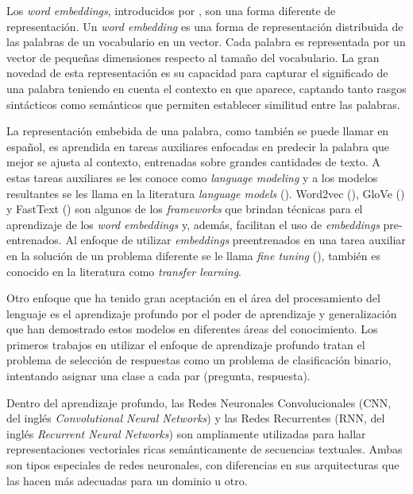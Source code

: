 Los \textit{word embeddings}, introducidos por \cite{mikolov-2013-word2vec}, son una forma diferente de representación. Un \textit{word embedding} es una forma de representación distribuida de las palabras de un vocabulario en un vector. Cada palabra es representada por un vector de pequeñas dimensiones respecto al tamaño del vocabulario. La gran novedad de esta representación es su capacidad para capturar el significado de una palabra teniendo en cuenta el contexto en que aparece, captando tanto rasgos sintácticos como semánticos que permiten establecer similitud entre las palabras.

La representación embebida de una palabra, como también se puede llamar en español, es aprendida en tareas auxiliares enfocadas en predecir la palabra que mejor se ajusta al contexto, entrenadas sobre grandes cantidades de texto. A estas tareas auxiliares se les conoce como \textit{language modeling} y a los modelos resultantes se les llama en la literatura \textit{language models} (\cite{rao-2019-nlpPython}). Word2vec (\cite{mikolov-2013-word2vec}), GloVe (\cite{pennington-2014-glove}) y FastText (\cite{mikolov-2016-fastext}) son algunos de los \textit{frameworks} que brindan técnicas para el aprendizaje de los \textit{word embeddings} y, además, facilitan el uso de \textit{embeddings} pre-entrenados. Al enfoque de utilizar \textit{embeddings} preentrenados en una tarea auxiliar en la solución de un problema diferente se le llama \textit{fine tuning} (\cite{rao-2019-nlpPython}), también es conocido en la literatura como \textit{transfer learning}.

Otro enfoque que ha tenido gran aceptación en el área del procesamiento del lenguaje es el aprendizaje profundo por el poder de aprendizaje y generalización que han demostrado estos modelos en diferentes áreas del conocimiento. Los primeros trabajos en utilizar el enfoque de aprendizaje profundo tratan el problema de selección de respuestas como un problema de clasificación binario, intentando asignar una clase a cada par (pregunta, respuesta).

Dentro del aprendizaje profundo, las Redes Neuronales Convolucionales (CNN, del inglés \textit{Convolutional Neural Networks}) y las Redes Recurrentes (RNN, del inglés \textit{Recurrent Neural Networks}) son ampliamente utilizadas para hallar representaciones vectoriales ricas semánticamente de secuencias textuales. Ambas son tipos especiales de redes neuronales, con diferencias en sus arquitecturas que las hacen más adecuadas para un dominio u otro.

